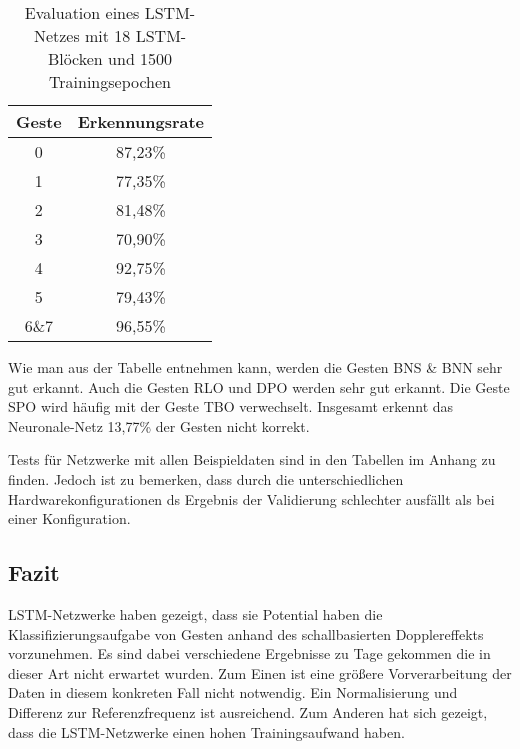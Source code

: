 \begin{table}[h]
\centering
\begin{tabular}{|c|c|}
\hline
 \textbf{Geste} & \textbf{Erkennungsrate} \\
 \hline
  0 &87,23\% \\  
  \hline
  1 &77,35\% \\
 \hline
  2 &81,48\% \\
 \hline
  3 &70,90\% \\
 \hline
  4 &92,75\% \\
 \hline
  5 &79,43\% \\
 \hline
  6\&7&96,55\%\\
 \hline
\end{tabular}
\caption[Evaluation eines LSTM-Netzes]{Evaluation eines LSTM-Netzes mit 18 LSTM-Blöcken und 1500 Trainingsepochen}
\label{tab:eval}
\end{table}
Wie man aus der Tabelle entnehmen kann, werden die Gesten \ac{BNS} \& \ac{BNN} sehr gut erkannt. 
Auch die Gesten \ac{RLO} und \ac{DPO} werden sehr gut erkannt. Die Geste \ac{SPO} 
wird häufig mit der Geste \ac{TBO} verwechselt.
Insgesamt erkennt das Neuronale-Netz 13,77\% der Gesten nicht korrekt. 

Tests für Netzwerke mit allen Beispieldaten sind in den Tabellen im Anhang zu
finden. Jedoch ist zu bemerken, dass durch die unterschiedlichen
Hardwarekonfigurationen ds Ergebnis der Validierung schlechter ausfällt als bei
einer Konfiguration.


\subsection{Fazit}
\ac{LSTM}-Netzwerke haben gezeigt, dass sie Potential haben die
Klassifizierungsaufgabe von Gesten anhand des schallbasierten Dopplereffekts
vorzunehmen. Es sind dabei verschiedene Ergebnisse zu Tage gekommen die in dieser
Art nicht erwartet wurden. Zum Einen ist eine größere Vorverarbeitung der
Daten in diesem konkreten Fall nicht notwendig. Ein Normalisierung und Differenz
zur Referenzfrequenz ist ausreichend. Zum Anderen hat sich gezeigt, dass die
\ac{LSTM}-Netzwerke einen hohen Trainingsaufwand haben. 

